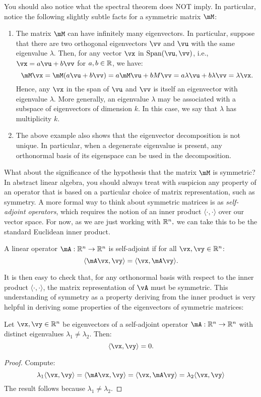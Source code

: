 You should also notice what the spectral theorem does NOT imply. In particular, notice the following slightly subtle facts for a symmetric matrix $\mM$:
\begin{enumerate}
\item The matrix $\mM$ can have infinitely many eigenvectors. In particular, suppose that there are two orthogonal eigenvectors $\vv$ and $\vu$ with the same eigenvalue $\lambda.$ Then, for any vector $\vx$ in $\textrm{Span}(\vu,\vv)$, i.e., $\vx = a \vu + b \vv$ for $a,b \in \mathbb{R}$, we have:
$$
\mM \vx = \mM  (a \vu + b \vv) = a \mM\vu + b M\vv = a\lambda \vu + b \lambda \vv= \lambda \vx.
$$
Hence, any $\vx$ in the span of $\vu$ and $\vv$ is itself an eigenvector with eigenvalue $\lambda.$
More generally, an eigenvalue $\lambda$ may be associated with a subspace of eigenvectors of dimension $k.$ In this case, we say that $\lambda$ has multiplicity $k.$
\item The above example also shows that the eigenvector decomposition is not unique. In particular, when a degenerate eigenvalue is present, any orthonormal basis of its eigenspace can be used in the decomposition.
\end{enumerate}

What about the significance of the hypothesis that the matrix $\mM$ is symmetric? In abstract linear algebra, you should always treat with suspicion any property of an operator that is based on a particular choice of matrix representation, such as symmetry. A more formal way to think about symmetric matrices is as {\it self-adjoint operators}, which requires the notion of an inner product $\langle \cdot, \cdot \rangle$ over our vector space. For now, as we are just working with $\mathbb{R}^n,$ we can take this to be the standard Euclidean inner product.

\begin{definition} \label{def:self-adjoint}
A linear operator $\mA: \R^n \to \R^n$ is self-adjoint if  for all $\vx,\vy \in \R^n$:
$$
\langle \mA\vx, \vy \rangle = \langle \vx, \mA \vy \rangle.
$$
\end{definition}
It is then easy to check that, for any orthonormal basis with respect to the inner product $\langle \cdot, \cdot \rangle$, the matrix representation of $\vA$ must be symmetric. This understanding of symmetry as a property deriving from the inner product is very helpful in deriving some properties of the eigenvectors of symmetric matrices:
\begin{lemma}\label{lem:distinct-eigenvalues}
Let $\vx, \vy \in \R^n$ be eigenvectors of a self-adjoint operator $\mA: \R^n \to \R^n$ with distinct eigenvalues $\lambda_1 \neq \lambda_2$. Then: 
$$
\langle \vx, \vy \rangle = 0.
$$
\end{lemma}
\begin{proof}
Compute:
$$
\lambda_1 \langle \vx, \vy \rangle = \langle \mA\vx, \vy \rangle = \langle \vx, \mA\vy \rangle  = \lambda_2 \langle \vx, \vy \rangle
$$
The result follows because $\lambda_1 \neq \lambda_2$.
\end{proof}

